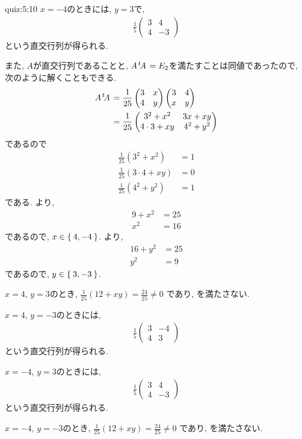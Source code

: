 \begin{answerof}{quiz:5:10}
  $x=-4$のときには,
  $y=3$で,
  \begin{align*}
    \frac{1}{5}\begin{pmatrix}3&4\\4&-3\end{pmatrix}
  \end{align*}
  という直交行列が得られる.


  また, $A$が直交行列であることと, $A{\left.^{t}\!A\right.}=E_2$を満たすことは同値であったので, 次のように解くこともできる.
  \begin{align*}
    A{\left.^{t}\!A\right.}
    &=\frac{1}{25}\begin{pmatrix}3&x\\4&y\end{pmatrix}\begin{pmatrix}3&4\\x&y\end{pmatrix}\\
    &=\frac{1}{25}\begin{pmatrix}3^2+x^2&3x+xy\\4\cdot 3+xy&4^2+y^2\end{pmatrix}
  \end{align*}
  であるので
  \begin{align}
    \frac{1}{25}(3^2+x^2)&=1\label{orthomat:eq4}\\
    \frac{1}{25}(3\cdot 4+xy)&=0\label{orthomat:eq5}\\
    \frac{1}{25}(4^2+y^2)&=1\label{orthomat:eq6}
  \end{align}
  である.
  より, 
  \begin{align*}
    9+x^2&=25\\
    x^2&=16
  \end{align*}
  であるので, $x\in\Set{4,-4}$.
    より, 
  \begin{align*}
    16+y^2&=25\\
    y^2&=9
  \end{align*}
  であるので, $y\in\Set{3,-3}$.

  $x=4$, $y=3$のとき,
  $\frac{1}{25}(12+xy)=\frac{24}{25}\neq 0$
  であり,
   を満たさない.

  $x=4$,
  $y=-3$のときには,
  \begin{align*}
    \frac{1}{5}\begin{pmatrix}3&-4\\4&3\end{pmatrix}
  \end{align*}
  という直交行列が得られる.

  $x=-4$,
  $y=3$のときには,
  \begin{align*}
    \frac{1}{5}\begin{pmatrix}3&4\\4&-3\end{pmatrix}
  \end{align*}
  という直交行列が得られる.
  
  $x=-4$, $y=-3$のとき,
  $\frac{1}{25}(12+xy)=\frac{24}{25}\neq 0$
  であり,
   を満たさない.
\end{answerof}
